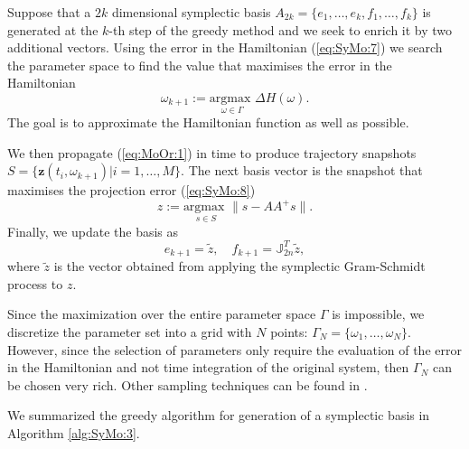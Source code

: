 Suppose that a $2k$ dimensional symplectic basis $A_{2k} = \{e_1,\dots ,e_k,f_1,\dots ,f_k\}$ is generated at the $k$-th step of the greedy method and we seek to enrich it by two additional vectors. Using the error in the Hamiltonian (\ref{eq:SyMo:7}) we search the parameter space to find the value that maximises the error in the Hamiltonian
\begin{equation}
	\omega_{k+1} := \underset{\omega\in \Gamma}{\text{argmax }}\Delta H(\omega).
\end{equation}
The goal is to approximate the Hamiltonian function as well as possible. 

We then propagate (\ref{eq:MoOr:1}) in time to produce trajectory snapshots $S=\{ \mathbf z(t_i,\omega_{k+1}) | i = 1,\dots,M \}$. The next basis vector is the snapshot that maximises the projection error (\ref{eq:SyMo:8})
\begin{equation}
	z := \underset{s\in S}{\text{argmax }} \| s - AA^+s \|.
\end{equation}
Finally, we update the basis as
\begin{equation}
	e_{k+1} = \tilde z, \quad f_{k+1} = \mathbb J_{2n}^T \tilde z,
\end{equation}
where $\tilde z$ is the vector obtained from applying the symplectic Gram-Schmidt process to $z$. 

Since the maximization over the entire parameter space $\Gamma$ is impossible, we discretize the parameter set into a grid with $N$ points: $\Gamma_N = \{ \omega_1,\dots,\omega_N\}$. However, since the selection of parameters only require the evaluation of the error in the Hamiltonian and not time integration of the original system, then $\Gamma_N$ can be chosen very rich. Other sampling techniques can be found in \cite{Quarteroni:2016wi}.

We summarized the greedy algorithm for generation of a symplectic basis in Algorithm \ref{alg:SyMo:3}.





